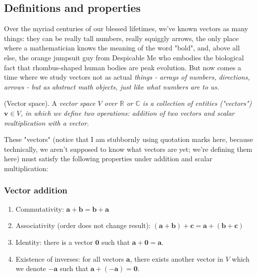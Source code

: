 \documentclass{article}
\begin{document}
\subsection{Definitions and properties}
Over the myriad centuries of our blessed lifetimes, we've known vectors as many things: they can be really tall numbers, really squiggly arrows, the only place where a mathematician knows the meaning of the word "bold", and, above all else, the orange jumpsuit guy from Despicable Me who embodies the biological fact that rhombus-shaped human bodies are peak evolution. But now comes a time where we study vectors not as actual \it things \normalfont - arrays of numbers, directions, arrows - but as abstract math objects, just like what numbers are to us. 
\begin{definition}
    (Vector space). A \it vector space $V$ \normalfont over $\mathbb{R}$ or $\mathbb{C}$ is a collection of entities ("vectors") $\mathbf{v} \in V$, in which we define two operations: addition of two vectors and scalar multiplication with a vector.
\end{definition}
These "vectors" (notice that I am stubbornly using quotation marks here, because technically, we aren't supposed to know what vectors are yet; we're defining them here) must satisfy the following properties under addition and scalar multiplication:
\subsubsection*{Vector addition}
\begin{enumerate}
    \item Commutativity: $\mathbf{a + b = b + a}$
    \item Associativity (order does not change result): $\mathbf{(a+b)+c=a+(b+c)}$
    \item Identity: there is a vector $\mathbf{0}$ such that $\mathbf{a+0=a}$.
    \item Existence of inverses: for all vectors $\mathbf{a}$, there exists another vector in $V$ which we denote $-\mathbf{a}$ such that $\mathbf{a+(-a)=0}$.
\end{enumerate}
\end{document}
